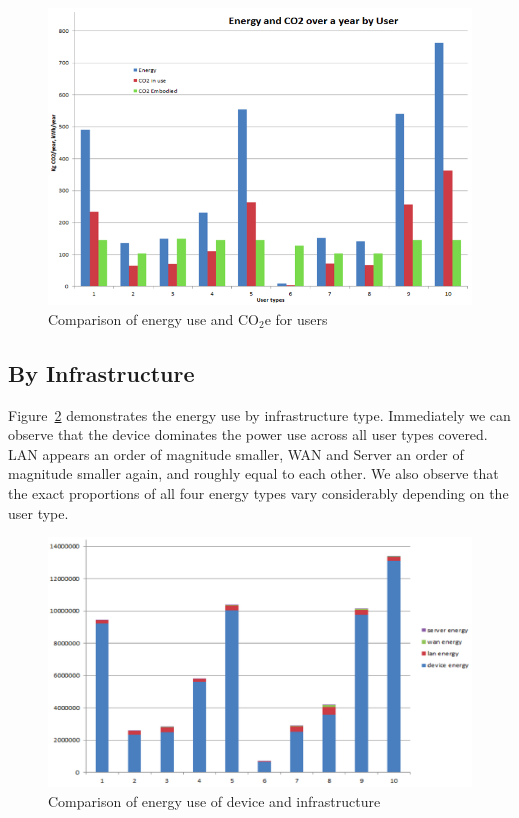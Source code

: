 \documentclass[conference]{IEEEtran}
\begin{document}
\begin{figure}[!htp]
\centering
\includegraphics[width=0.8\columnwidth]{images/energyuse_co2e_overyearbyuser.png}
\caption{Comparison of energy use and CO$_2$e for users}
\label{fig:energyuse_co2e_overyearbyuser} 
\end{figure}

\subsection{By Infrastructure}

Figure~\ref{fig:energyusecomparison} demonstrates the energy use by
infrastructure type. Immediately we can observe that the device
dominates the power use across all user types covered. LAN appears an
order of magnitude smaller, WAN and Server an order of magnitude
smaller again, and roughly equal to each other. We also observe that
the exact proportions of all four energy types vary considerably
depending on the user type.

\begin{figure}[!htp]
\centering
\includegraphics[width=0.8\columnwidth]{images/energyuse_comparison.png}
\caption{Comparison of energy use of device and infrastructure}
\label{fig:energyusecomparison} 
\end{figure}
\end{document}
